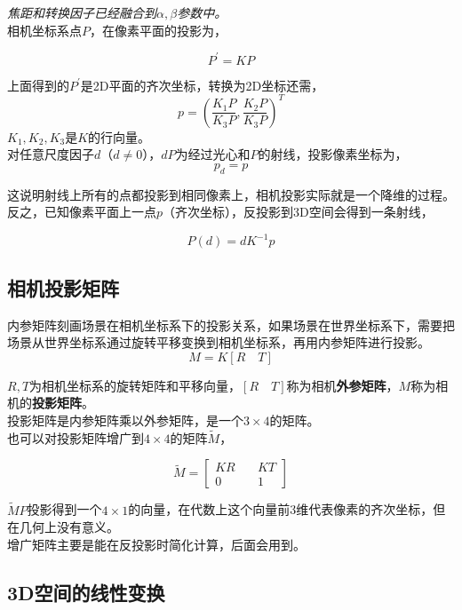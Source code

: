 \documentclass[hpyerref,UTF8,a4paper,titlepage,12pt,oneside]{ctexbook}
\theoremstyle{definition}
\begin{document}
	\textit{焦距和转换因子已经融合到$\alpha,\beta$参数中。}\\

	相机坐标系点$P$，在像素平面的投影为，

	$$
		P^{\prime}  = KP
	$$

	上面得到的$P^{\prime}$是2D平面的齐次坐标，转换为2D坐标还需，
	$$
		p = \left(\frac{K_1P}{K_3P}, \frac{K_2P}{K_3P}\right)^T
	$$
	$K_1,K_2,K_3$是$K$的行向量。\\

	对任意尺度因子$d$（$d\neq 0$），$dP$为经过光心和$P$的射线，投影像素坐标为，
	$$
		p_d = p
	$$

	这说明射线上所有的点都投影到相同像素上，相机投影实际就是一个降维的过程。\\

	反之，已知像素平面上一点$p$（齐次坐标），反投影到3D空间会得到一条射线，

	\begin{equation}
		P(d) = dK^{-1}p \label{inverse_proj}
	\end{equation}

\subsection{相机投影矩阵}
	内参矩阵刻画场景在相机坐标系下的投影关系，如果场景在世界坐标系下，需要把场景从世界坐标系通过旋转平移变换到相机坐标系，再用内参矩阵进行投影。
	$$
		M = K\left[R\quad T\right]
	$$

	$R,T$为相机坐标系的旋转矩阵和平移向量，$\left[R\quad T\right]$称为相机\textbf{外参矩阵}，$M$称为相机的\textbf{投影矩阵}。\\

	投影矩阵是内参矩阵乘以外参矩阵，是一个$3\times 4$的矩阵。\\

	也可以对投影矩阵增广到$4\times 4$的矩阵$\tilde{M}$，

	$$
		\tilde{M} = \begin{bmatrix}
			KR\quad& KT\\
			0\quad& 1
		\end{bmatrix}
	$$

	$\tilde{M}P$投影得到一个$4\times 1$的向量，在代数上这个向量前3维代表像素的齐次坐标，但在几何上没有意义。\\

	增广矩阵主要是能在反投影时简化计算，后面会用到。

\subsection{3D空间的线性变换}
\end{document}
